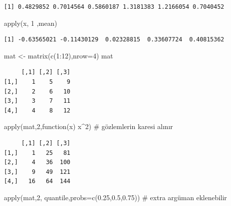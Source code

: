 \documentclass[
  letterpaper,
  DIV=11,
  numbers=noendperiod]{scrreprt}
\newenvironment{Shaded}{\begin{snugshade}}{\end{snugshade}}
\newcommand{\AttributeTok}[1]{\textcolor[rgb]{0.40,0.45,0.13}{#1}}
\newcommand{\CommentTok}[1]{\textcolor[rgb]{0.37,0.37,0.37}{#1}}
\newcommand{\ControlFlowTok}[1]{\textcolor[rgb]{0.00,0.23,0.31}{#1}}
\newcommand{\DecValTok}[1]{\textcolor[rgb]{0.68,0.00,0.00}{#1}}
\newcommand{\FloatTok}[1]{\textcolor[rgb]{0.68,0.00,0.00}{#1}}
\newcommand{\FunctionTok}[1]{\textcolor[rgb]{0.28,0.35,0.67}{#1}}
\newcommand{\NormalTok}[1]{\textcolor[rgb]{0.00,0.23,0.31}{#1}}
\newcommand{\OtherTok}[1]{\textcolor[rgb]{0.00,0.23,0.31}{#1}}
\newcommand{\SpecialCharTok}[1]{\textcolor[rgb]{0.37,0.37,0.37}{#1}}
\begin{document}
\begin{verbatim}
[1] 0.4829852 0.7014564 0.5860187 1.3181383 1.2166054 0.7040452
\end{verbatim}

\begin{Shaded}
\begin{Highlighting}[]
\FunctionTok{apply}\NormalTok{(x, }\DecValTok{1}\NormalTok{ ,mean)}
\end{Highlighting}
\end{Shaded}

\begin{verbatim}
[1] -0.63565021 -0.11430129  0.02328815  0.33607724  0.40815362
\end{verbatim}

\begin{Shaded}
\begin{Highlighting}[]
\NormalTok{mat }\OtherTok{\textless{}{-}} \FunctionTok{matrix}\NormalTok{(}\FunctionTok{c}\NormalTok{(}\DecValTok{1}\SpecialCharTok{:}\DecValTok{12}\NormalTok{),}\AttributeTok{nrow=}\DecValTok{4}\NormalTok{)}
\NormalTok{mat}
\end{Highlighting}
\end{Shaded}

\begin{verbatim}
     [,1] [,2] [,3]
[1,]    1    5    9
[2,]    2    6   10
[3,]    3    7   11
[4,]    4    8   12
\end{verbatim}

\begin{Shaded}
\begin{Highlighting}[]
\FunctionTok{apply}\NormalTok{(mat,}\DecValTok{2}\NormalTok{,}\ControlFlowTok{function}\NormalTok{(x) x}\SpecialCharTok{\^{}}\DecValTok{2}\NormalTok{) }\CommentTok{\# gözlemlerin karesi alınır}
\end{Highlighting}
\end{Shaded}

\begin{verbatim}
     [,1] [,2] [,3]
[1,]    1   25   81
[2,]    4   36  100
[3,]    9   49  121
[4,]   16   64  144
\end{verbatim}

\begin{Shaded}
\begin{Highlighting}[]
\FunctionTok{apply}\NormalTok{(mat,}\DecValTok{2}\NormalTok{, quantile,}\AttributeTok{probs=}\FunctionTok{c}\NormalTok{(}\FloatTok{0.25}\NormalTok{,}\FloatTok{0.5}\NormalTok{,}\FloatTok{0.75}\NormalTok{)) }\CommentTok{\# extra argüman eklenebilir}
\end{Highlighting}
\end{Shaded}
\end{document}

